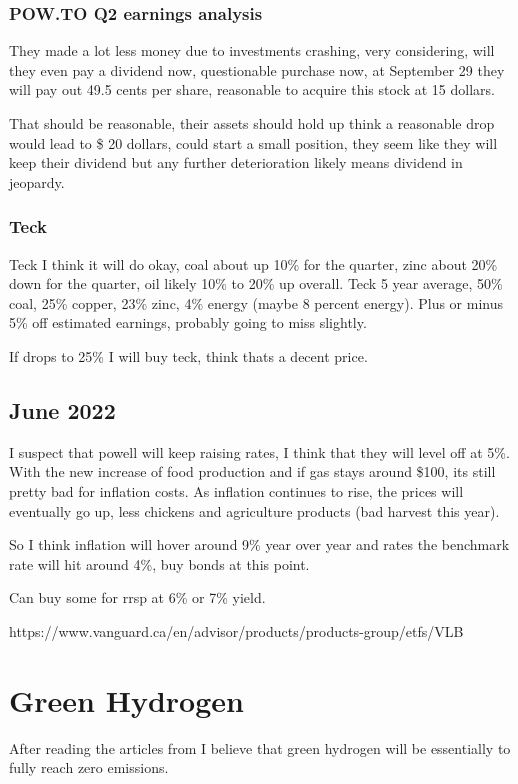 \subsubsection{POW.TO Q2 earnings analysis}

They made a lot less money due to investments crashing, very considering, will they even pay a dividend now, questionable purchase now, at 	September 29 they will pay out 49.5 cents per share, reasonable to acquire this stock at 15 dollars.

That should be reasonable, their assets should hold up think a reasonable drop would lead to \$ 20 dollars, could start a small position, they seem like they will keep their dividend but any further deterioration likely means dividend in jeopardy.

\subsubsection{Teck}
Teck I think it will do okay, coal about up 10\% for the quarter, zinc about 20\% down for the quarter, oil likely 10\% to 20\% up overall. Teck 5 year average, 50\% coal, 25\% copper, 23\% zinc, 4\% energy (maybe 8 percent energy). Plus or minus 5\% off estimated earnings, probably going to miss slightly.

If drops to 25\% I will buy teck, think thats a decent price.

\subsection{June 2022}

I suspect that powell will keep raising rates, I think that they will level off at 5\%. With the new increase of food production and if gas stays around \$100, its still pretty bad for inflation costs. As inflation continues to rise, the prices will eventually go up, less chickens and agriculture products (bad harvest this year).

So I think inflation will hover around 9\% year over year and rates the benchmark rate will hit around 4\%, buy bonds at this point.

Can buy some for rrsp at 6\% or 7\% yield.

https://www.vanguard.ca/en/advisor/products/products-group/etfs/VLB

\section{Green Hydrogen}
After reading the articles from \cite{goldman_sachs_hydrogen_2022} I believe that green hydrogen will be essentially to fully reach zero emissions.

